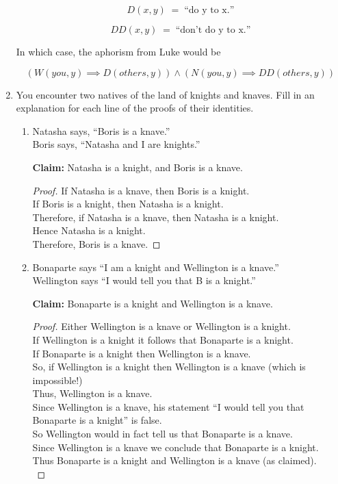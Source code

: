 \begin{enumerate}
{\[ D(x,y)  \; = \; \mbox{``do y to x.''} \]

\[ DD(x,y)  \; = \; \mbox{``don't do y to x.''} \]

In which case, the aphorism from Luke would be

\[ (W(you, y) \implies  D(others, y)) \land (N(you, y) \implies DD(others, y)) \]

}

\workbookpagebreak
\textbookpagebreak

\item You encounter two natives of the land of knights and knaves.  Fill
in an explanation for each line of the proofs of their identities. 

\begin{enumerate}
\item Natasha says, ``Boris is a knave.'' \\
Boris says, ``Natasha and I are knights.''\\

\hintspagebreak

\textbf{Claim:} Natasha is a knight, and Boris is a knave.\\

\begin{proof} If Natasha is a knave, then Boris is a knight.\\
If Boris is a knight, then Natasha is a knight.\\
Therefore, if Natasha is a knave, then Natasha is a knight.\\
Hence Natasha is a knight.\\
Therefore, Boris is a knave.
\end{proof}

\item Bonaparte says ``I am a knight and Wellington is a knave.''\\
Wellington says ``I would tell you that B is a knight.''

\textbf{Claim:} Bonaparte is a knight and Wellington is a knave.

\begin{proof}
    Either Wellington is a knave or Wellington is a knight.\\
    If Wellington is a knight it follows that Bonaparte is a knight.\\
    If Bonaparte is a knight then Wellington is a knave. \\
    So, if Wellington is a knight then Wellington is a knave (which is impossible!)\\
    Thus, Wellington is a knave.\\
    Since Wellington is a knave, his statement ``I would tell you that Bonaparte is a knight'' is false. \\
    So Wellington would in fact tell us that Bonaparte is a knave. \\
    Since Wellington is a knave we conclude that Bonaparte is a knight.\\
    Thus Bonaparte is a knight and Wellington is a knave (as claimed).\\
\end{proof}


\end{enumerate}
\end{enumerate}
